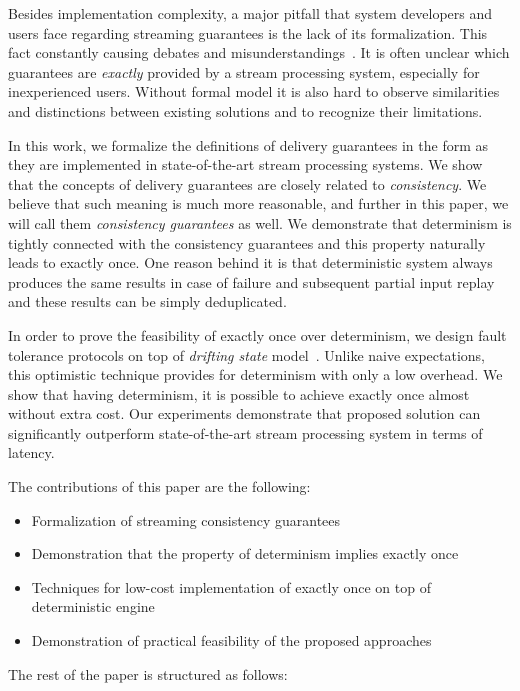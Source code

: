 Besides implementation complexity, a major pitfall that system developers and users face regarding streaming guarantees is the lack of its formalization. This fact constantly causing debates and misunderstandings~\cite{JerryPengStreamIO, PaperTrail}. It is often unclear which guarantees are {\em exactly} provided by a stream processing system, especially for inexperienced users. Without formal model it is also hard to observe similarities and distinctions between existing solutions and to recognize their limitations.

In this work, we formalize the definitions of delivery guarantees in the form as they are implemented in state-of-the-art stream processing systems. We show that the concepts of delivery guarantees are closely related to {\em consistency}. We believe that such meaning is much more reasonable, and further in this paper, we will call them {\em consistency guarantees} as well. We demonstrate that determinism is tightly connected with the consistency guarantees and this property naturally leads to exactly once. One reason behind it is that deterministic system always produces the same results in case of failure and subsequent partial input replay and these results can be simply deduplicated.

In order to prove the feasibility of exactly once over determinism, we design fault tolerance protocols on top of {\em drifting state} model~\cite{we2018adbis}. Unlike naive expectations, this optimistic technique provides for determinism with only a low overhead. We show that having determinism, it is possible to achieve exactly once almost without extra cost. Our experiments demonstrate that proposed solution can significantly outperform state-of-the-art stream processing system in terms of latency.

The contributions of this paper are the following: 
\begin{itemize}
    \item Formalization of streaming consistency guarantees 
    \item Demonstration that the property of determinism implies exactly once
    \item Techniques for low-cost implementation of exactly once on top of deterministic engine
    \item Demonstration of practical feasibility of the proposed approaches
\end{itemize}

The rest of the paper is structured as follows: 


